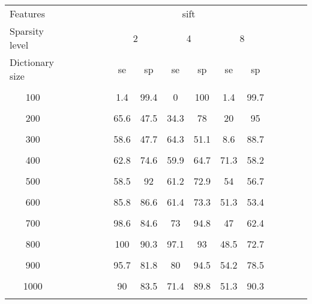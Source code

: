 \begin{table}
{\begin{tabularx}{0.94\linewidth}{@{}l cccccc		cccccc  @{}}
\end{tabularx}
}
\bigskip
\begin{tabularx}{0.94\linewidth}{l ccccc		cccccc		cccc @{}}
\toprule
Features &  &  &  &  &  & \multicolumn{6}{c}{\ac{sift}} &  &  &  & \\
   \cmidrule(r){7-12}    
Sparsity level &  &  &  &  &  & \multicolumn{2}{c}{2}& \multicolumn{2}{c}{4}& \multicolumn{2}{c}{8} &  &  &  & \\ 
   \cmidrule(r){7-8} \cmidrule(r){9-10} \cmidrule(r){11-12} 
  Dictionary size &  &  &  &   &  & \acs{se} & \acs{sp} & \acs{se} & \acs{sp} & \acs{se}  & \acs{sp} &  &  &  & \\ \midrule
\multicolumn{16}{c}{}\\[-2.2ex]  
\multicolumn{1}{c}{100} &  &  &  &  &  & 1.4 & 99.4 & 0 & 100 & 1.4 & 99.7 &  &  &  & \\
\multicolumn{16}{c}{}\\[-2.2ex] 
\multicolumn{1}{c}{200} &  &  &  &  &  & 65.6 & 47.5 & 34.3 & 78 & 20 & 95 &  &  &  & \\
\multicolumn{16}{c}{}\\[-2.2ex] 
\multicolumn{1}{c}{300} &  &  &  &  &  & 58.6 & 47.7 & 64.3 & 51.1 & 8.6 & 88.7 &  &  &  & \\
\multicolumn{16}{c}{}\\[-2.2ex] 
\multicolumn{1}{c}{400} &  &  &  &  &  & 62.8 & 74.6 & 59.9 & 64.7 & \cellcolor[gray]{0.6}71.3 & \cellcolor[gray]{0.6}58.2 &  &  &  &\\
\multicolumn{16}{c}{}\\[-2.2ex]  
\multicolumn{1}{c}{500} &  &  &  &  &  & 58.5 & 92 &  61.2 & 72.9 & 54 & 56.7 &  &  &  &\\
\multicolumn{16}{c}{}\\[-2.2ex] 
\multicolumn{1}{c}{600} &  &  &  &  &  & 85.8 & 86.6 &  61.4 & 73.3 & 51.3 & 53.4 &  &  &  &\\
\multicolumn{16}{c}{}\\[-2.2ex] 
\multicolumn{1}{c}{700} &  &  &  &  &  & \cellcolor[gray]{0.8}98.6 & \cellcolor[gray]{0.8}84.6 & 73 & 94.8 & 47 & 62.4 &  &  &  &\\
\multicolumn{16}{c}{}\\[-2.2ex]  
\multicolumn{1}{c}{800} &  &  &  &  &  & \cellcolor[gray]{0.6}100 & \cellcolor[gray]{0.6}90.3 & \cellcolor[gray]{0.6}97.1 & \cellcolor[gray]{0.6}93 & 48.5 & 72.7 &  &  &  &\\
\multicolumn{16}{c}{}\\[-2.2ex] 
\multicolumn{1}{c}{900} &  &  &  &  &  & 95.7 & 81.8 & \cellcolor[gray]{0.8}80 & \cellcolor[gray]{0.8}94.5 & \cellcolor[gray]{0.8}54.2 & \cellcolor[gray]{0.8}78.5 &  &  &  &\\
\multicolumn{16}{c}{}\\[-2.2ex] 
\multicolumn{1}{c}{1000} &  &  &  &  &  & 90   & 83.5 &  71.4  & 89.8 & 51.3 & 90.3 &  &  &  &\\
\multicolumn{16}{c}{}\\[-2.2ex] 
\bottomrule
\end{tabularx}

\end{table}
